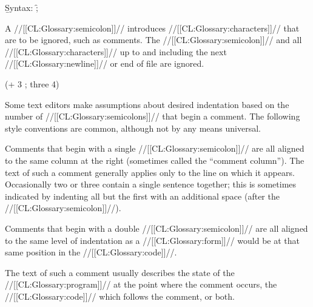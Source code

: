 \b{Syntax:} \f{;}



A //[[CL:Glossary:semicolon]]// introduces //[[CL:Glossary:characters]]// that are to be ignored,
such as comments.  The //[[CL:Glossary:semicolon]]// and all //[[CL:Glossary:characters]]// up to
and including the next //[[CL:Glossary:newline]]// or end of file are ignored.


\code
 (+ 3 ; three
    4)
\endcode

\endsubsubsection%


Some text editors make assumptions about desired indentation based on
the number of //[[CL:Glossary:semicolons]]// that begin a comment.  The following style 
conventions are common, although not by any means universal.  




Comments that begin with a single //[[CL:Glossary:semicolon]]// are all aligned to 
the same column at the right (sometimes called the ``comment column'').
The text of such a comment generally applies only to the line on which it appears.
Occasionally two or three contain a single sentence together;
this is sometimes indicated by indenting all but the first with an additional
space (after the //[[CL:Glossary:semicolon]]//).

\endsubsubsubsection%




Comments that begin with a double //[[CL:Glossary:semicolon]]// are all aligned to
the same level of indentation as a //[[CL:Glossary:form]]// would be at that same
position in the //[[CL:Glossary:code]]//.



The text of such a comment usually describes
    the state of the //[[CL:Glossary:program]]// at the point where the comment occurs,
    the //[[CL:Glossary:code]]// which follows the comment,
 or both.

\endsubsubsubsection%




